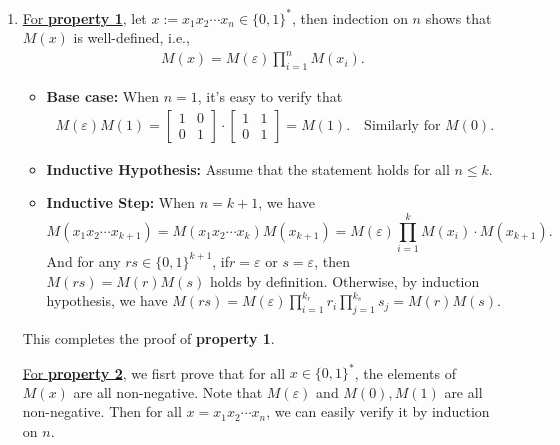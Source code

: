 \begin{answer}
	\begin{enumerate}[label=\alph*).]
		\item \underline{For \textbf{property 1}}, let $x := x_1x_2\cdots x_n \in \{0,1\}^*$, then indection on $n$ shows that $M(x)$ is well-defined, i.e., 
		\begin{align*}
			M(x) = M(\varepsilon) \prod_{i=1}^{n} M(x_i).
		\end{align*}
		\begin{itemize}
			\item \textbf{Base case:} When $n = 1$, it's easy to verify that 
			\begin{align*}
				M(\varepsilon)M(1)= \begin{bmatrix}1&0\\0&1\end{bmatrix}\cdot \begin{bmatrix}1&1\\0&1\end{bmatrix} = M(1). \quad \text{Similarly for $M(0)$.} 
			\end{align*}
			\item \textbf{Inductive Hypothesis:} Assume that the statement holds for all $n\le k$.
			\item \textbf{Inductive Step:} When $n = k+1$, we have 
			\[
				M(x_1x_2\cdots x_{k+1}) = M(x_1x_2\cdots x_k)M(x_{k+1}) = M(\varepsilon) \prod_{i=1}^{k} M(x_i)\cdot M(x_{k+1}).
			\]
			And for any $rs \in \{0,1\}^{k+1}$, if$r = \varepsilon$ or $s = \varepsilon$, then $M(rs) = M(r)M(s)$ holds by definition. Otherwise, by induction hypothesis, we have $M(rs) = M(\varepsilon) \prod_{i=1}^{k_r} r_i \prod_{j=1}^{k_s} s_j = M(r)M(s)$.
		\end{itemize}
		This completes the proof of \textbf{property 1}.
		
		\underline{For \textbf{property 2}}, we fisrt prove that for all $x\in \{0,1\}^*$, the elements of $M(x)$ are all non-negative. Note that $M(\varepsilon)$ and $M(0), M(1)$ are all non-negative. Then for all $x = x_1x_2\cdots x_n$, we can easily verify it by induction on $n$.


\end{enumerate}
\end{answer}
